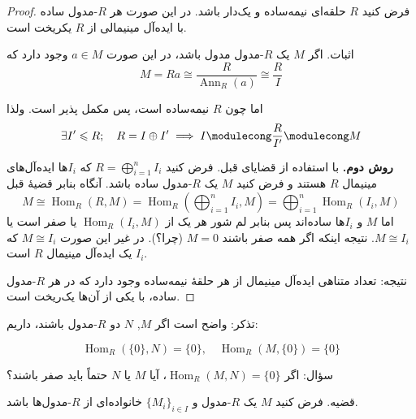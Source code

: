 \section{}








\begin{proof}
    فرض کنید $R$ حلقه‌ای نیمه‌ساده و یک‌دار باشد. در این صورت هر $R$-مدول ساده با ایده‌آل مینیمالی از $R$ یکریخت است.

    اثبات.
    اگر
    \(M\)
    یک
    \(R\)-مدول
    مدول باشد، در این صورت
    \(a\in M\)
    وجود دارد که
    \[
        M = Ra \cong \frac{R}{\operatorname{Ann}_R(a)} \cong \frac{R}{I}
    \]

    اما چون $R$ نیمه‌ساده است،
    پس
    مکمل پذیر است. ولذا
    \[
        \exists I' \leqslant R; \quad R = I \oplus I' \implies I \modulecong \frac{R}{I'} \modulecong M
    \]

    \textbf{روش دوم.}
    با استفاده از قضایای قبل.
    فرض کنید $R = \bigoplus_{i=1}^n I_i$ که $I_i$ها ایده‌آل‌های مینیمال $R$ هستند و فرض کنید $M$ یک $R$-مدول ساده باشد. آنگاه بنابر قضیهٔ قبل
    \[
        M \cong \operatorname{Hom}_R(R, M) = \operatorname{Hom}_R \left( \bigoplus_{i=1}^n I_i , M \right)
        = \bigoplus_{i=1}^n \operatorname{Hom}_R(I_i, M)
    \]
    اما $M$ و $I_i$ها ساده‌اند پس بنابر لم شور هر یک از $\operatorname{Hom}_R(I_i, M)$ یا صفر است یا $M \cong I_i$. نتیجه اینکه اگر همه صفر باشند $M = 0$ (چرا؟). در غیر این صورت $M \cong I_i$ که $I_i$ یک ایده‌آل مینیمال $R$ است.

    نتیجه: تعداد متناهی ایده‌آل مینیمال از هر حلقهٔ نیمه‌ساده وجود دارد که در هر $R$-مدول ساده، با یکی از آن‌ها یک‌ریخت است.
\end{proof}



\noindent
تذکر: واضح است اگر $M$, $N$ دو $R$-مدول باشند، داریم:

\[
    \operatorname{Hom}_R(\{0\}, N) = \{0\}, \quad \operatorname{Hom}_R(M, \{0\}) = \{0\}
\]


\vspace{1em}

سؤال: اگر $\operatorname{Hom}_R(M, N) = \{0\}$، آیا $M$ یا $N$ حتماً باید صفر باشند؟

\vspace{1em}

\noindent
قضیه. فرض کنید $M$ یک $R$-مدول و $\{M_i\}_{i \in I}$ خانواده‌ای از $R$-مدول‌ها باشد.

